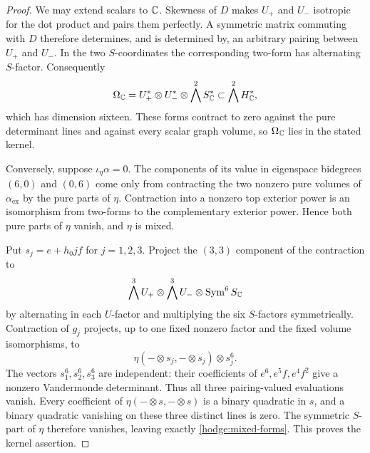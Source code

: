 \begin{proof}
We may extend scalars to $\mathbb C$.  Skewness of $D$ makes $U_+$ and $U_-$
isotropic for the dot product and pairs them perfectly.  A symmetric
matrix commuting with $D$ therefore determines, and is determined by,
an arbitrary pairing between $U_+$ and $U_-$.  In the two $S$-coordinates
the corresponding two-form has alternating $S$-factor.  Consequently
\begin{equation}
 \Omega_\mathbb C=
 U_+^*\otimes U_-^*\otimes\bigwedge^2S_\mathbb C^*
       \subset\bigwedge^2H_\mathbb C^*,
 \label{hodge:mixed-forms}
\end{equation}
which has dimension sixteen.  These forms contract to zero against the
pure determinant lines and against every scalar graph volume, so
$\Omega_\mathbb C$ lies in the stated kernel.

Conversely, suppose $\iota_\eta\alpha=0$.  The components of its value
in eigenspace bidegrees $(6,0)$ and $(0,6)$ come only from contracting
the two nonzero pure volumes of $\alpha_{\mathrm{ex}}$ by the pure parts
of $\eta$.  Contraction into a nonzero top exterior power is an
isomorphism from two-forms to the complementary exterior power.  Hence
both pure parts of $\eta$ vanish, and $\eta$ is mixed.

Put $s_j=e+h_0jf$ for $j=1,2,3$.
Project the $(3,3)$ component of the contraction to
\[
 \bigwedge^3U_+\otimes\bigwedge^3U_-\otimes
              \operatorname{Sym}^6S_\mathbb C
\]
by alternating in each $U$-factor and multiplying the six $S$-factors
symmetrically.  Contraction of $g_j$ projects, up to one fixed nonzero
factor and the fixed volume isomorphisms, to
\[
 \eta(-\otimes s_j,-\otimes s_j)\otimes s_j^6.
\]
The vectors $s_1^6,s_2^6,s_3^6$ are independent: their coefficients of
$e^6,e^5f,e^4f^2$ give a nonzero Vandermonde determinant.
Thus all three pairing-valued evaluations vanish.  Every coefficient
of $\eta(-\otimes s,-\otimes s)$ is a binary quadratic in $s$,
and a binary quadratic vanishing on these three distinct lines is zero.
The symmetric $S$-part of $\eta$ therefore vanishes, leaving exactly
\eqref{hodge:mixed-forms}.  This proves the kernel assertion.


\end{proof}
